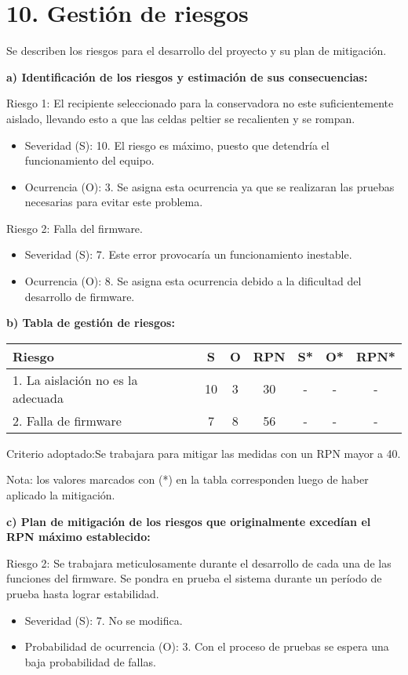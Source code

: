 \section{10. Gestión de riesgos}
\label{sec:riesgos}
Se describen los riesgos para el desarrollo del proyecto y su plan de mitigación.

\textbf{a) Identificación de los riesgos y estimación de sus consecuencias:}
 
Riesgo 1: El recipiente seleccionado para la conservadora no este suficientemente aislado, llevando esto a que las celdas peltier se recalienten y se rompan.
\begin{itemize}
\item Severidad (S): 10. El riesgo es máximo, puesto que detendría el funcionamiento del equipo.
\item Ocurrencia (O): 3. Se asigna esta ocurrencia ya que se realizaran las pruebas necesarias para evitar este problema.
\end{itemize}   

Riesgo 2: Falla del firmware.
\begin{itemize}
\item Severidad (S): 7. Este error provocaría un funcionamiento inestable.
\item Ocurrencia (O): 8. Se asigna esta ocurrencia debido a la dificultad del desarrollo de firmware.
\end{itemize}   


\textbf{b) Tabla de gestión de riesgos:}

\begin{table}[htpb]
\centering
\begin{tabularx}{\linewidth}{@{}|X|c|c|c|c|c|c|@{}}
\hline
\rowcolor[HTML]{C0C0C0} 
Riesgo & S & O & RPN & S* & O* & RPN*  \\ \hline
1. La aislación no es la adecuada & 10 & 3 & 30 & - &  -  & - \\ \hline
2. Falla de firmware & 7 & 8 & 56 & - &  -  & - \\ \hline
\end{tabularx}%
\end{table}

Criterio adoptado:Se trabajara para mitigar las medidas con un RPN mayor a 40.

Nota: los valores marcados con (*) en la tabla corresponden luego de haber aplicado la mitigación.

\textbf{c) Plan de mitigación de los riesgos que originalmente excedían el RPN máximo establecido:}

Riesgo 2: Se trabajara meticulosamente durante el desarrollo de cada una de las funciones del firmware. Se pondra en prueba el sistema durante un período de prueba hasta lograr estabilidad.
\begin{itemize}
\item Severidad (S): 7. No se modifica.
\item Probabilidad de ocurrencia (O): 3. Con el proceso de pruebas se espera una baja probabilidad de fallas.
\end{itemize}